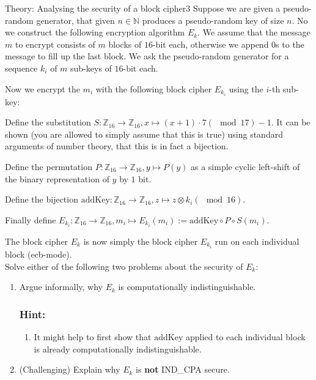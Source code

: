 \documentclass[a4paper]{article}
\begin{document}
\begin{problem}{Theory: Analysing the security of a block cipher}{3}
Suppose we are given a pseudo-random generator, that given $n\in\mathbb{N}$ produces a pseudo-random key of size $n$. %
No we construct the following encryption algorithm $E_k$. We assume that the message $m$ to encrypt consists of $m$ blocks of $16$-bit each, otherwise we append $0$s to the message to fill up the last block. We ask the pseudo-random generator for a sequence $k_i$ of $m$ sub-keys of $16$-bit each. 

Now we encrypt the $m_i$ with the following block cipher $E_{k_i}$ using the $i$-th sub-key:
\begin{compactitem}
  \item Define the substitution $S:\mathbb{Z}_{16}\to\mathbb{Z}_{16}, x\longmapsto (x+1)\cdot 7(\mod 17)-1$. It can be shown (you are allowed to simply assume that this is true) using standard arguments of number theory, that this is in fact a bijection. 
  \item Define the permutation $P:\mathbb{Z}_{16}\to\mathbb{Z}_{16}, y\longmapsto P(y)$ as a simple cyclic left-shift of the binary representation of $y$ by $1$ bit.
  \item Define the bijection $\mathrm{addKey}:\mathbb{Z}_{16}\to\mathbb{Z}_{16}, z\longmapsto z\otimes k_i(\mod 16)$.
  \item Finally define $E_{k_i}:\mathbb{Z}_{16}\to\mathbb{Z}_{16}, m_i\longmapsto E_{k_i}(m_i):=\mathrm{addKey}\circ P \circ S(m_i)$.
\end{compactitem}
The block cipher $E_k$ is now simply the block cipher $E_{k_i}$ run on each individual block (ecb-mode). 
\\

Solve either of the following two problems about the security of $E_k$:
\begin{enumerate}
  \item Argue informally, why $E_{k}$ is computationally indistinguishable. 
  \subsubsection*{Hint:}\begin{enumerate}
  	\item[] It might help to first show that $\mathrm{addKey}$ applied to each individual block is already computationally indistinguishable. 
  \end{enumerate}
  \item (Challenging) Explain why $E_k$ is \textbf{not} IND\_CPA secure. 

\end{enumerate}
\end{problem}
\end{document}
